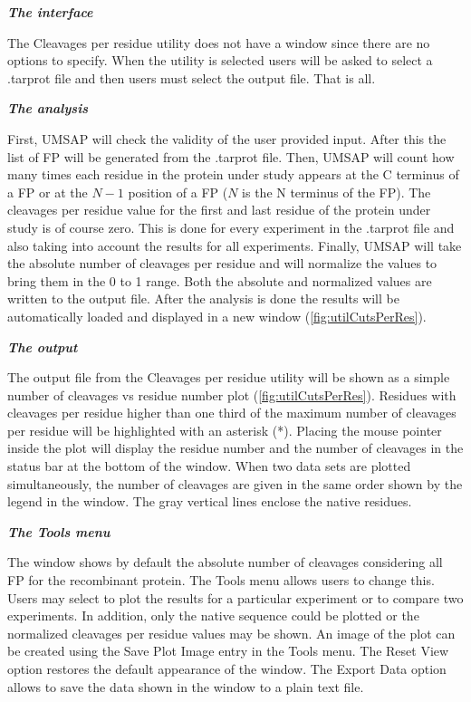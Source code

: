 \textit{\textbf{The interface}}

The Cleavages per residue utility does not have a window since there are no options to specify. When the utility is selected users will be asked to select a .tarprot file and then users must select the output file. That is all.

\textit{\textbf{The analysis}}

First, UMSAP will check the validity of the user provided input. After this the list of FP will be generated from the .tarprot file. Then, UMSAP will count how many times each residue in the protein under study appears at the C terminus of a FP or at the \(N-1\) position of a FP (\(N\) is the N terminus of the FP). The cleavages per residue value for the first and last residue of the protein under study is of course zero. This is done for every experiment in the .tarprot file and also taking into account the results for all experiments. Finally, UMSAP will take the absolute number of cleavages per residue and will normalize the values to bring them in the 0 to 1 range. Both the absolute and normalized values are written to the output file. After the analysis is done the results will be automatically loaded and displayed in a new window (\autoref{fig:utilCutsPerRes}). 

\textit{\textbf{The output}}

The output file from the Cleavages per residue utility will be shown as a simple number of cleavages vs residue number plot (\autoref{fig:utilCutsPerRes}). Residues with cleavages per residue higher than one third of the maximum number of cleavages per residue will be highlighted with an asterisk (*). Placing the mouse pointer inside the plot will display the residue number and the number of cleavages in the status bar at the bottom of the window. When two data sets are plotted simultaneously, the number of cleavages are given in the same order shown by the legend in the window. The gray vertical lines enclose the native residues. 

\textit{\textbf{The Tools menu}}

The window shows by default the absolute number of cleavages considering all FP for the recombinant protein. The Tools menu allows users to change this. Users may select to plot the results for a particular experiment or to compare two experiments. In addition, only the native sequence could be plotted or the normalized cleavages per residue values may be shown. An image of the plot can be created using the Save Plot Image entry in the Tools menu. The Reset View option restores the default appearance of the window. The Export Data option allows to save the data shown in the window to a plain text file.  

